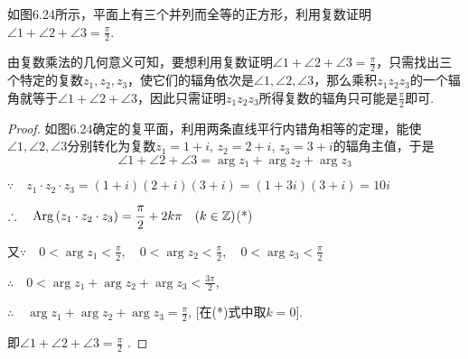\begin{example}
如图6.24所示，平面上有三个并列而全等的正方形，利用复数证明$\angle 1+\angle 2+\angle 3=\frac{\pi}{2}$.
\end{example}

\begin{figure}[htp]
    \centering
{}
    \caption{}
\end{figure}

\begin{analyze}
    由复数乘法的几何意义可知，要想利用复数证明$\angle 1+\angle 2+\angle 3=\frac{\pi}{2}$，只需找出三个特定的复数$z_1,z_2,z_3$，使它们的辐角依次是$\angle 1, \angle 2, \angle 3$，那么乘积$z_1z_2z_3$的一个辐角就等于$\angle 1+\angle 2+\angle 3$，因此只需证明$z_1z_2z_3$所得复数的辐角只可能是$\frac{\pi}{2}$即可.
\end{analyze}

\begin{proof}
    如图6.24确定的复平面，利用两条直线平行内错角相等的定理，能使$\angle1,\angle2,\angle3$分别转化为复数$z_1=1+i$, $z_2=2+i$, $z_3=3+i$的辐角主值，于是
$$\angle1+\angle2+\angle3=\arg z_1+\arg z_2+\arg z_3$$

$\because\quad z_1\cdot z_2\cdot z_3=(1+i)(2+i)(3+i)=(1+3i)(3+i)=10i$

$\therefore\quad {\rm Arg\,}( z_1\cdot  z_2\cdot  z_3) = \dfrac \pi 2+ 2k\pi\quad ( k\in \mathbb{Z})$\hfill (*) 

又$\because\quad 0<\arg z_{1}<\frac{\pi}{2},\quad 0<\arg z_{2}<\frac{\pi}{2},\quad 0<\arg z_{3}<\frac{\pi}{2}$

$\therefore\quad 0<\arg z_{1}+\arg z_{2}+\arg z_{3}<\frac{3\pi}{2}$,

$\therefore\quad \arg z_1+\arg z_2+\arg z_3=\frac\pi2$, [在(*)式中取$k=0$].

即$\angle 1+ \angle 2+ \angle 3= \frac \pi 2$ .
\end{proof}


